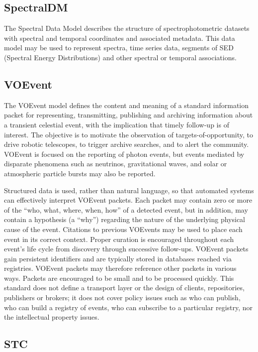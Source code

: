 \documentclass[11pt,a4paper]{ivoa}
\begin{document}
\subsection{SpectralDM}

The Spectral Data Model describes the structure of spectrophotometric datasets with spectral and 
temporal coordinates and associated metadata. This data model may be used to represent spectra, 
time series data, segments of SED (Spectral Energy Distributions) and other spectral or temporal 
associations. 

\subsection{VOEvent} 

The VOEvent model defines the content and meaning of a standard information packet for 
representing, transmitting, publishing and archiving information about a transient celestial 
event, with the implication that timely follow-up is of interest. The objective is to motivate 
the observation of targets-of-opportunity, to drive robotic telescopes, to trigger archive 
searches, and to alert the community. VOEvent is focused on the reporting of photon events, 
but events mediated by disparate phenomena such as neutrinos, gravitational waves, and solar 
or atmospheric particle bursts may also be reported.

Structured data is used, rather than natural language, so that automated systems can effectively 
interpret VOEvent packets. Each packet may contain zero or more of the ``who, what, where, when, how''
of a detected event, but in addition, may contain a hypothesis (a ``why'') regarding the nature of 
the underlying physical cause of the event. Citations to previous VOEvents may be used to place 
each event in its correct context. Proper curation is encouraged throughout each event's life 
cycle from discovery through successive follow-ups. VOEvent packets gain persistent identifiers 
and are typically stored in databases reached via registries. VOEvent packets may therefore 
reference other packets in various ways. Packets are encouraged to be small and to be processed 
quickly. This standard does not define a transport layer or the design of clients, repositories, 
publishers or brokers; it does not cover policy issues such as who can publish, who can build a 
registry of events, who can subscribe to a particular registry, nor the intellectual property issues. 

\subsection{STC}
\end{document}
